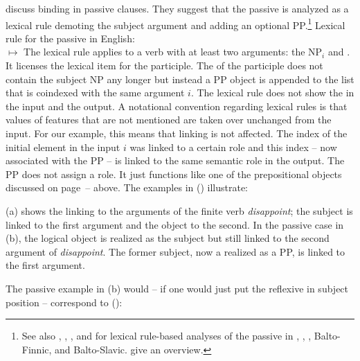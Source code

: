 \documentclass[output=paper
 	        ,biblatex
                ,babelshorthands
                ,newtxmath
                ,draftmode
                ,colorlinks, citecolor=brown
]{langscibook}
\begin{document}
\citet{MS98a} discuss binding in passive clauses. They suggest that the passive is analyzed as a
lexical rule demoting the subject argument and adding an optional PP.\footnote{
  See also , , , and  for lexical rule-based analyses of the
  passive in 
, , , Balto-Finnic, and Balto-Slavic.  give an overview.
} 
\ea
Lexical rule for the passive in English:\\
$\mapsto$
\z
The lexical rule applies to a verb with at least two arguments: the NP$_i$ and . It licenses
the lexical item for the participle. The \argstl of the participle does not contain the subject NP
any longer but instead a PP object is appended to the list that is coindexed with the same argument $i$. 
The lexical rule does not show the \contv in the input and the output. A notational convention
regarding lexical rules is that values of features that are not mentioned are taken over unchanged
from the input. For our example, this means that linking is not affected. The index of the initial
element in the input $i$ was linked to a certain role and this index -- now associated with the PP
-- is linked to the same semantic role in the output. The PP does not assign a role. It just
functions like one of the prepositional objects discussed on
page~\pageref{binding:page-prepositional-objects-start}--\pageref{binding:page-prepositional-objects-end}
above. The examples in () illustrate:

{\jamwidth=5cm
\eal
{}
\zl
(a) shows the linking to the arguments of the finite verb \emph{disappoint}; the subject is
linked to the first argument and the object to the second. In the passive case in (b), the
logical object is realized as the subject but still linked to the second argument of
\emph{disappoint}. The former subject, now a realized as a PP, is linked to the first argument. 

The passive example in (b) would -- if one would just put the reflexive in subject position
-- correspond to ():
\z
}
\end{document}
